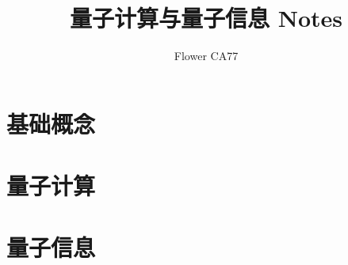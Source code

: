 \documentclass[
    8pt,
    mathfont=none,
    a4paper,
    class=book
]{easybook}
\title{量子计算与量子信息 Notes}
\author{Flower CA77}
\date{}
\theoremstyle{default_style}
\begin{document}
\maketitle
\tableofcontents

\part{基础概念}



















\part{量子计算}





































\part{量子信息}






\end{document}

